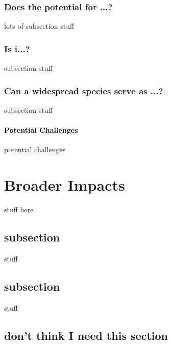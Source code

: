 \subsubsection*{Does the potential for ...?}
lots of subsection stuff

\subsubsection*{Is i...?}

subsection stuff

\subsubsection*{Can a widespread species serve as ...?}

subsection stuff

\paragraph{Potential Challenges} 
potential challenges 

\section*{Broader Impacts}
stuff here

\subsection*{subsection}
stuff

\subsection*{subsection}
stuff



\subsection*{don't think I need this section} 

